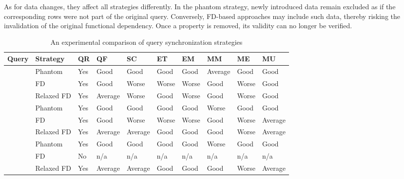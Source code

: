 As for data changes, they affect all strategies differently. In the phantom strategy, newly introduced data remain excluded as if the corresponding rows were not part of the original query. Conversely, FD-based approaches may include such data, thereby risking the invalidation of the original functional dependency. Once a property is removed, its validity can no longer be verified.


\begin{table}[h]
\scriptsize
\centering
\caption{An experimental comparison of query synchronization strategies}
\begin{threeparttable}
\begin{tabular}{
>{\raggedright\arraybackslash}p{12mm}
>{\raggedright\arraybackslash}p{14mm}
>{\raggedright\arraybackslash}p{5mm}
>{\raggedleft\arraybackslash}p{10mm}
>{\raggedleft\arraybackslash}p{10mm}
>{\raggedleft\arraybackslash}p{10mm}
>{\raggedleft\arraybackslash}p{10mm}
>{\raggedleft\arraybackslash}p{10mm}
>{\raggedleft\arraybackslash}p{10mm}
>{\raggedleft\arraybackslash}p{10mm}
}
\toprule
\textbf{Query
} &
\textbf{Strategy
} & \textbf{QR%
} & \textbf{QF%
} & \textbf{SC%
} & \textbf{ET%
} & \textbf{EM%
} & \textbf{MM%
} & \textbf{ME%
} & \textbf{MU%
} \\
\midrule
\multirow{3}{12mm}{\textbf{$Q_1$}} & Phantom & Yes & Good& Good & Good & Good & Average & Good & Good  \\
& FD & Yes & Good& Worse & Worse & Worse & Good & Worse & Good  \\
& Relaxed FD & Yes & Average& Worse & Good & Worse & Good & Worse & Good  \\
\midrule
\multirow{3}{12mm}{\textbf{$Q_2$}} &Phantom & Yes & Good& Good & Good & Good & Worse & Good & Good  \\
& FD & Yes & Good& Worse & Worse & Worse & Good & Worse & Average  \\
& Relaxed FD & Yes & Average & Average & Good & Good & Good & Worse & Average \\
\midrule
\multirow{3}{12mm}{\textbf{$Q_3$}}&Phantom & Yes & Good & Good & Good & Good & Worse & Good & Good \\
& FD & No & n/a & n/a & n/a & n/a & n/a & n/a & n/a \\
& Relaxed FD & Yes & Average& Average & Good & Good & Good & Worse & Average  \\

\end{tabular}
\end{threeparttable}
\end{table}
